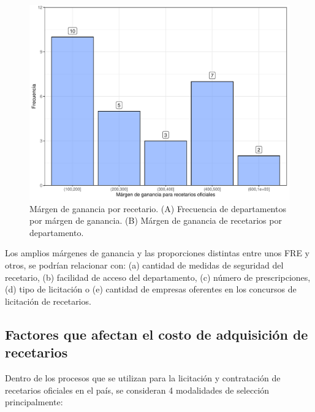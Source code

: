 \documentclass[
]{book}
\begin{document}
\begin{figure}

{\centering \includegraphics[width=1\linewidth]{InformeFinal_files/figure-latex/comparativoDepartamentos0-1} 

}

\caption{Márgen de ganancia por recetario. (A) Frecuencia de departamentos por márgen de ganancia. (B) Márgen de ganancia de recetarios por departamento.}\label{fig:comparativoDepartamentos0}
\end{figure}

Los amplios márgenes de ganancia y las proporciones distintas entre unos FRE y otros, se podrían relacionar con: (a) cantidad de medidas de seguridad del recetario, (b) facilidad de acceso del departamento, (c) número de prescripciones, (d) tipo de licitación o (e) cantidad de empresas oferentes en los concursos de licitación de recetarios.

\hypertarget{factores-que-afectan-el-costo-de-adquisiciuxf3n-de-recetarios}{%
\subsection{Factores que afectan el costo de adquisición de recetarios}\label{factores-que-afectan-el-costo-de-adquisiciuxf3n-de-recetarios}}

Dentro de los procesos que se utilizan para la licitación y contratación de recetarios oficiales en el país, se consideran 4 modalidades de selección principalmente:
\end{document}
